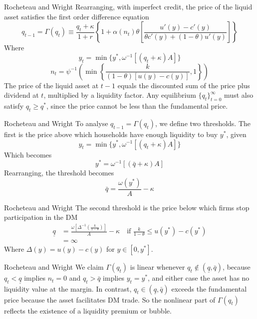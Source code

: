 \documentclass[aspectratio=169,xcolor=dvipsnames]{beamer}
\begin{document}
\begin{frame}{Rocheteau and Wright}
    Rearranging, with imperfect credit, the price of the liquid asset satisfies the first order difference equation
    \[
        q_{t-1} = \Gamma(q_t) \equiv \frac{q_t + \kappa}{1 + r}\left\{ 1 + \alpha(n_t) \theta \left[ \frac{u'(y) - c'(y)}{\theta c'(y) + (1 - \theta) u'(y)}\right]\right\}
    \]
    Where
    \[
        y_t = \min\{y^*, \omega^{-1}[(q_t + \kappa) A]\}
    \]
    \[
        n_t = \psi^{-1}\left( \min \left\{ \frac{k}{(1-\theta)[u(y) - c(y)]}, 1\right\}\right)
    \]
    The price of the liquid asset at $t-1$ equals the discounted sum of the price plus dividend at $t$, multiplied by a liquidity factor. Any equilibrium $\{q_t\}_{t=0}^\infty$ must also satisfy $q_t \ge q^*$, since the price cannot be less than the fundamental price.
\end{frame}

\begin{frame}{Rocheteau and Wright}
    To analyse $q_{t-1} = \Gamma(q_t)$, we define two thresholds. The first is the price above which households have enough liquidity to buy $y^*$, given
    \[
        y_t = \min\{y^*, \omega^{-1}[(q_t + \kappa) A]\}
    \]
    Which becomes
    \[
        y^* = \omega^{-1}[(\bar q + \kappa) A]
    \]
    Rearranging, the threshold becomes
    \[
        \bar q = \frac{\omega(y^*)}{A} - \kappa
    \]
\end{frame}

\begin{frame}{Rocheteau and Wright}
    The second threshold is the price below which firms stop participation in the DM
    \begin{align*}
        \underline q &= \frac{\omega \left[ \Delta^{-1} \left(\frac{k}{1-\theta}\right)\right]}{A} - \kappa \quad \text{if } \frac{k}{1-\theta} \le u(y^*) - c(y^*) \\
        &= \infty
    \end{align*}
    Where $\Delta(y) = u(y) - c(y)$ for $y \in [0, y^*]$.
\end{frame}

\begin{frame}{Rocheteau and Wright}
    We claim $\Gamma(q_t)$ is linear whenever $q_t \notin (\underline q, \bar q)$, because $q_t < \underline q$ implies $n_t = 0$ and $q_t > \bar q$ implies $y_t = y^*$, and either case the asset has no liquidity value at the margin. In contrast, $q_t \in (\underline q, \bar q)$ exceeds the fundamental price because the asset facilitates DM trade. So the nonlinear part of $\Gamma(q_t)$ reflects the existence of a liquidity premium or bubble.
\end{frame}
\end{document}
